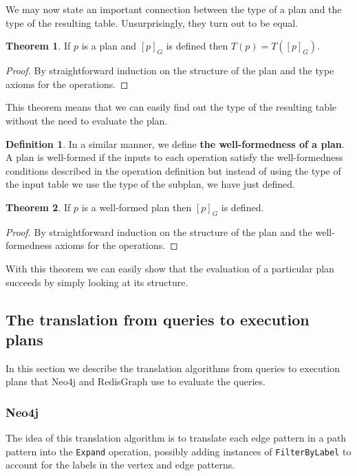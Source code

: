 \documentclass[14pt]{constructor-thesis}
\theoremstyle{definition}
\newtheorem*{theorem}{Theorem}
\newtheorem*{definition}{Definition}
\begin{document}
We may now state an important connection between the type of a plan and the type of the resulting table. Unsurprisingly, they turn out to be equal.

\begin{theorem}
  If $p$ is a plan and $[p]_G$ is defined then $T(p) = T([p]_G)$.
\end{theorem}
\begin{proof}
  By straightforward induction on the structure of the plan and the type axioms for the operations.
\end{proof}

This theorem means that we can easily find out the type of the resulting table without the need to evaluate the plan.

\begin{definition}
  In a similar manner, we define \textbf{the well-formedness of a plan}. A plan is well-formed if the inputs to each operation satisfy the well-formedness conditions described in the operation definition but instead of using the type of the input table we use the type of the subplan, we have just defined.
\end{definition}

\begin{theorem}
  If $p$ is a well-formed plan then $[p]_G$ is defined.
\end{theorem}
\begin{proof}
  By straightforward induction on the structure of the plan and the well-formedness axioms for the operations.
\end{proof}

With this theorem we can easily show that the evaluation of a particular plan succeeds by simply looking at its structure.

\subsection{The translation from queries to execution plans}

In this section we describe the translation algorithms from queries to execution plans that Neo4j and RedisGraph use to evaluate the queries.

\subsubsection{Neo4j}

The idea of this translation algorithm is to translate each edge pattern in a path pattern into the \texttt{Expand} operation, possibly adding instances of \texttt{FilterByLabel} to account for the labels in the vertex and edge patterns.
\end{document}
